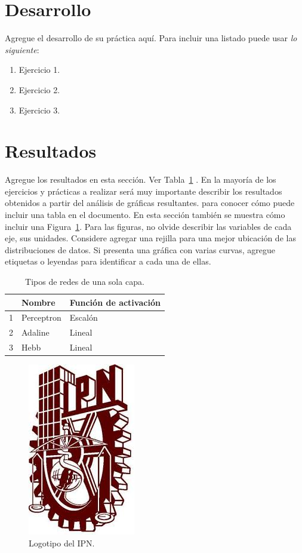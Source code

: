 \documentclass{article}
\begin{document}
\section{Desarrollo} %
Agregue el desarrollo de su práctica aquí. Para incluir una listado puede usar \textit{lo siguiente}:

\begin{enumerate}
    \item Ejercicio 1.
    \item Ejercicio 2.
    \item Ejercicio 3.
\end{enumerate}

\section{Resultados} %
Agregue los resultados en esta sección. Ver Tabla~\ref{tab:redes} \cite{Haykin99a}. En la mayoría de los ejercicios y prácticas a realizar será muy importante describir los resultados obtenidos a partir del análisis de gráficas resultantes.  para conocer cómo puede incluir una tabla en el documento. En esta sección también se muestra cómo incluir una Figura~\ref{fig:logoIPN}. Para las figuras, no olvide describir las variables de cada eje, sus unidades. Considere agregar una rejilla para una mejor ubicación de las distribuciones de datos. Si presenta una gráfica con varias curvas, agregue etiquetas o leyendas para identificar a cada una de ellas.

\begin{table}[h] %
\caption{Tipos de redes de una sola capa.}
    \centering
    \begin{tabular}{rll}
    & Nombre & Función de activación \\
    \hline
    1 & Perceptron & Escalón  \\
    2 & Adaline & Lineal \\
    3 & Hebb & Lineal \\
    \end{tabular}
    \label{tab:redes}
\end{table}

\begin{figure}[h]
    \centering
    \includegraphics[width=0.15\linewidth]{figuras/IPN.jpg}
    \caption{Logotipo del IPN.}
    \label{fig:logoIPN}
\end{figure}
\end{document}
